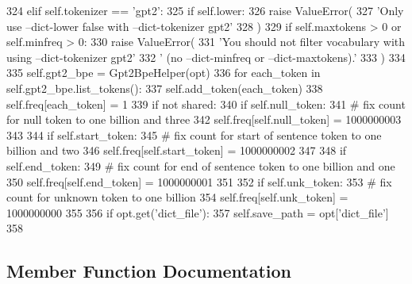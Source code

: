\begin{DoxyCode}
324         \textcolor{keywordflow}{elif} self.tokenizer == \textcolor{stringliteral}{'gpt2'}:
325             \textcolor{keywordflow}{if} self.lower:
326                 \textcolor{keywordflow}{raise} ValueError(
327                     \textcolor{stringliteral}{'Only use --dict-lower false with --dict-tokenizer gpt2'}
328                 )
329             \textcolor{keywordflow}{if} self.maxtokens > 0 \textcolor{keywordflow}{or} self.minfreq > 0:
330                 \textcolor{keywordflow}{raise} ValueError(
331                     \textcolor{stringliteral}{'You should not filter vocabulary with using --dict-tokenizer gpt2'}
332                     \textcolor{stringliteral}{' (no --dict-minfreq or --dict-maxtokens).'}
333                 )
334 
335             self.gpt2\_bpe = Gpt2BpeHelper(opt)
336             \textcolor{keywordflow}{for} each\_token \textcolor{keywordflow}{in} self.gpt2\_bpe.list\_tokens():
337                 self.add\_token(each\_token)
338                 self.freq[each\_token] = 1
339         \textcolor{keywordflow}{if} \textcolor{keywordflow}{not} shared:
340             \textcolor{keywordflow}{if} self.null\_token:
341                 \textcolor{comment}{# fix count for null token to one billion and three}
342                 self.freq[self.null\_token] = 1000000003
343 
344             \textcolor{keywordflow}{if} self.start\_token:
345                 \textcolor{comment}{# fix count for start of sentence token to one billion and two}
346                 self.freq[self.start\_token] = 1000000002
347 
348             \textcolor{keywordflow}{if} self.end\_token:
349                 \textcolor{comment}{# fix count for end of sentence token to one billion and one}
350                 self.freq[self.end\_token] = 1000000001
351 
352             \textcolor{keywordflow}{if} self.unk\_token:
353                 \textcolor{comment}{# fix count for unknown token to one billion}
354                 self.freq[self.unk\_token] = 1000000000
355 
356             \textcolor{keywordflow}{if} opt.get(\textcolor{stringliteral}{'dict\_file'}):
357                 self.save\_path = opt[\textcolor{stringliteral}{'dict\_file'}]
358 
\end{DoxyCode}


\subsection{Member Function Documentation}
\mbox{\label{classparlai_1_1core_1_1dict_1_1DictionaryAgent_a29f4181dcdd5f53103bc342bf5f3c74a}} 
